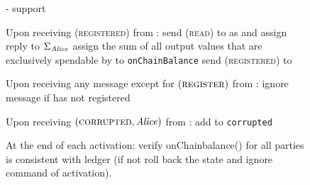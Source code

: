 \begin{figure}[!htbp]
\begin{systembox}{\fpaynet - support}
\begin{algorithmic}[1]
      \State Upon receiving (\textsc{registered}) from \alice:
      \Indent
        \State send (\textsc{read}) to \ledger{} as \alice{} and assign reply to
        $\Sigma_{\mathit{Alice}}$
        \State assign the sum of all output values that are exclusively
        spendable by \alice{} to \texttt{onChainBalance}
        \State send (\textsc{registered}) to \alice
      \EndIndent
      \State

      \State Upon receiving any message except for
      $\left(\textsc{register}\right)$ from \alice:
      \Indent
        \State ignore message if \alice{} has not registered
      \EndIndent
      \State

      \State Upon receiving $\left(\textsc{corrupted}, \mathit{Alice}\right)$ from
      \simulator:
      \Indent
        \State add \alice{} to \texttt{corrupted}
      \EndIndent
      \State

      \State At the end of each activation: 
      \Indent
        \State verify onChainbalance() for all parties is consistent with ledger
        (if not roll back the state and ignore command of activation).
      \EndIndent
    \end{algorithmic}
  \end{systembox}
  \caption{}
  \label{alg:fpaynet:support}
\end{figure}


